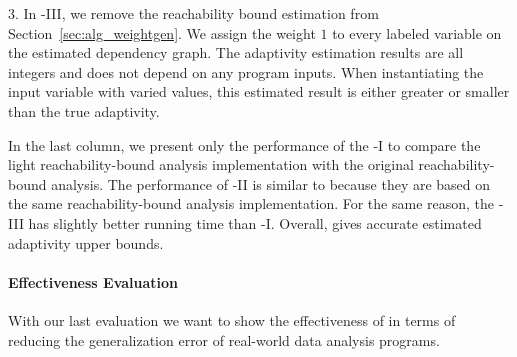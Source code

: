 
3. In {\THESYSTEM}-III, we remove the reachability bound estimation from Section~\ref{sec:alg_weightgen}.
We assign the weight $1$ to every labeled variable on the estimated dependency graph.
The adaptivity estimation results are all integers and does not depend on any program inputs.
When instantiating the input variable with varied values, this estimated result is either greater or smaller than the true adaptivity.

In the last column, we present only the performance of the {\THESYSTEM}-I to compare the
light reachability-bound analysis implementation with the original reachability-bound analysis.
The performance of {\THESYSTEM}-II is similar to {\THESYSTEM} because they are based on the same
reachability-bound analysis implementation. For the same reason, the {\THESYSTEM}-III has slightly better
running time than {\THESYSTEM}-I.
Overall, {\THESYSTEM} gives accurate estimated
adaptivity upper bounds.


\paragraph{Effectiveness Evaluation}

With our last evaluation we want to show the effectiveness of {\THESYSTEM} in terms of reducing the generalization error of real-world data analysis programs.

